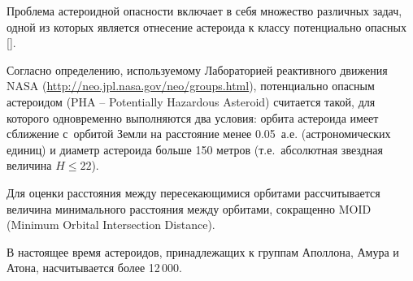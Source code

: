 %




\date{15/X/2014} %










\makerutitle











Проблема астероидной опасности включает в себя множество различных задач, одной из которых является отнесение астероида к классу потенциально опасных []. 

Согласно определению, используемому Лабораторией реактивного движения NASA \mbox{(\url{http://neo.jpl.nasa.gov/neo/groups.html})}, потенциально опасным астероидом (PHA -- Potentially Hazardous Asteroid) считается такой, для которого одновременно выполняются два условия: орбита астероида имеет сближение с~орбитой Земли на расстояние менее \mbox{0.05~а.е.} (астрономических единиц) и диаметр астероида больше 150 метров (т.е.~абсолютная звездная величина $H\leqslant22$). 

Для оценки расстояния между пересекающимися орбитами рассчитывается величина минимального расстояния между орбитами, сокращенно MOID (Minimum Orbital Intersection Distance). 



В настоящее время астероидов, принадлежащих к группам Аполлона, Амура и Атона, насчитывается более 12\,000. 

